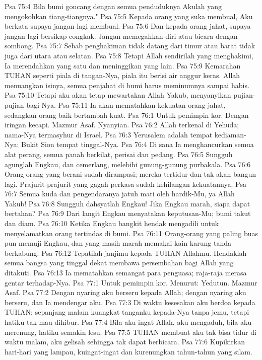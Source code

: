 Psa 75:4  Bila bumi goncang dengan semua penduduknya Akulah yang mengokohkan tiang-tiangnya."
Psa 75:5  Kepada orang yang suka membual, Aku berkata supaya jangan lagi membual.
Psa 75:6  Dan kepada orang jahat, supaya jangan lagi bersikap congkak. Jangan memegahkan diri atau bicara dengan sombong.
Psa 75:7  Sebab penghakiman tidak datang dari timur atau barat tidak juga dari utara atau selatan.
Psa 75:8  Tetapi Allah sendirilah yang menghakimi, Ia merendahkan yang satu dan meninggikan yang lain.
Psa 75:9  Kemarahan TUHAN seperti piala di tangan-Nya, piala itu berisi air anggur keras. Allah menuangkan isinya, semua penjahat di bumi harus meminumnya sampai habis.
Psa 75:10  Tetapi aku akan tetap mewartakan Allah Yakub, menyanyikan pujian-pujian bagi-Nya.
Psa 75:11  Ia akan mematahkan kekuatan orang jahat, sedangkan orang baik bertambah kuat.
Psa 76:1  Untuk pemimpin kor. Dengan iringan kecapi. Mazmur Asaf. Nyanyian.
Psa 76:2  Allah terkenal di Yehuda; nama-Nya termasyhur di Israel.
Psa 76:3  Yerusalem adalah tempat kediaman-Nya; Bukit Sion tempat tinggal-Nya.
Psa 76:4  Di sana Ia menghancurkan semua alat perang, semua panah berkilat, perisai dan pedang.
Psa 76:5  Sungguh agunglah Engkau, dan cemerlang, melebihi gunung-gunung purbakala.
Psa 76:6  Orang-orang yang berani sudah dirampasi; mereka tertidur dan tak akan bangun lagi. Prajurit-prajurit yang gagah perkasa sudah kehilangan kekuatannya.
Psa 76:7  Semua kuda dan pengendaranya jatuh mati oleh hardik-Mu, ya Allah Yakub!
Psa 76:8  Sungguh dahsyatlah Engkau! Jika Engkau marah, siapa dapat bertahan?
Psa 76:9  Dari langit Engkau menyatakan keputusan-Mu; bumi takut dan diam.
Psa 76:10  Ketika Engkau bangkit hendak mengadili untuk menyelamatkan orang tertindas di bumi.
Psa 76:11  Orang-orang yang paling buas pun memuji Engkau, dan yang masih marah memakai kain karung tanda berkabung.
Psa 76:12  Tepatilah janjimu kepada TUHAN Allahmu. Hendaklah semua bangsa yang tinggal dekat membawa persembahan bagi Allah yang ditakuti.
Psa 76:13  Ia mematahkan semangat para penguasa; raja-raja merasa gentar terhadap-Nya.
Psa 77:1  Untuk pemimpin kor. Menurut: Yedutun. Mazmur Asaf.
Psa 77:2  Dengan nyaring aku berseru kepada Allah; dengan nyaring aku berseru, dan Ia mendengar aku.
Psa 77:3  Di waktu kesesakan aku berdoa kepada TUHAN; sepanjang malam kuangkat tanganku kepada-Nya tanpa jemu, tetapi hatiku tak mau dihibur.
Psa 77:4  Bila aku ingat Allah, aku mengaduh, bila aku merenung, hatiku semakin lesu.
Psa 77:5  TUHAN membuat aku tak bisa tidur di waktu malam, aku gelisah sehingga tak dapat berbicara.
Psa 77:6  Kupikirkan hari-hari yang lampau, kuingat-ingat dan kurenungkan tahun-tahun yang silam.
